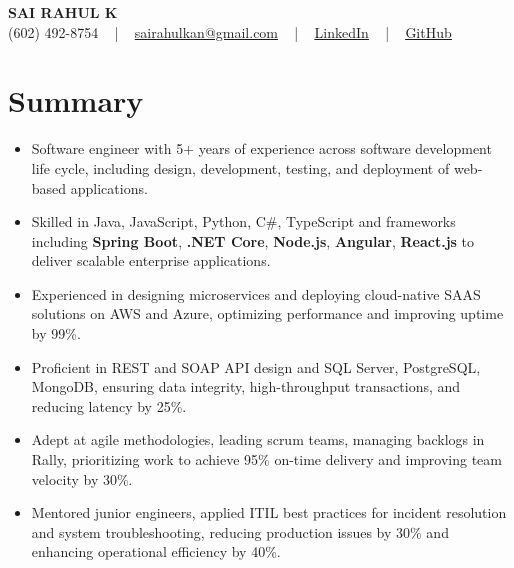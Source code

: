 \documentclass[letterpaper,11pt]{article}
\newcommand{\resumeItem}[1]{
  \item\footnotesize{
    {#1 \vspace{-2pt}}
  }
}
\newcommand{\resumeItemListStart}{\begin{itemize}[leftmargin=*]}
\newcommand{\resumeItemListEnd}{\end{itemize}\vspace{-5pt}}
\begin{document}
\begin{center}
    {\fontsize{14pt}{12pt}\selectfont \textbf{\MakeUppercase{Sai Rahul K}}}\\ \vspace{2pt}
    \fontsize{10pt}{12pt}\selectfont (602) 492-8754 ~ | ~ \href{mailto:sairahulkan@gmail.com}{sairahulkan@gmail.com} ~ | ~
    \href{https://www.linkedin.com/in/rq123/}{\color{blue}\underline{LinkedIn}} ~ | ~
    \href{https://github.com/kanrahuldo}{\color{blue}\underline{GitHub}}~
    \vspace{-8pt}
\end{center}

\section{Summary}
\fontsize{9pt}{10pt}\selectfont
\resumeItemListStart
    \resumeItem{Software engineer with 5+ years of experience across software development life cycle, including design, development, testing, and deployment of web-based applications.}
    \resumeItem{Skilled in Java, JavaScript, Python, C\#, TypeScript and frameworks including \textbf{Spring Boot}, \textbf{.NET Core}, \textbf{Node.js}, \textbf{Angular}, \textbf{React.js} to deliver scalable enterprise applications.}
    \resumeItem{Experienced in designing microservices and deploying cloud-native SAAS solutions on AWS and Azure, optimizing performance and improving uptime by 99\%.}
    \resumeItem{Proficient in REST and SOAP API design and SQL Server, PostgreSQL, MongoDB, ensuring data integrity, high-throughput transactions, and reducing latency by 25\%.}
    \resumeItem{Adept at agile methodologies, leading scrum teams, managing backlogs in Rally, prioritizing work to achieve 95\% on-time delivery and improving team velocity by 30\%.}
    \resumeItem{Mentored junior engineers, applied ITIL best practices for incident resolution and system troubleshooting, reducing production issues by 30\% and enhancing operational efficiency by 40\%.}
\resumeItemListEnd
\vspace{-6pt}
\end{document}
